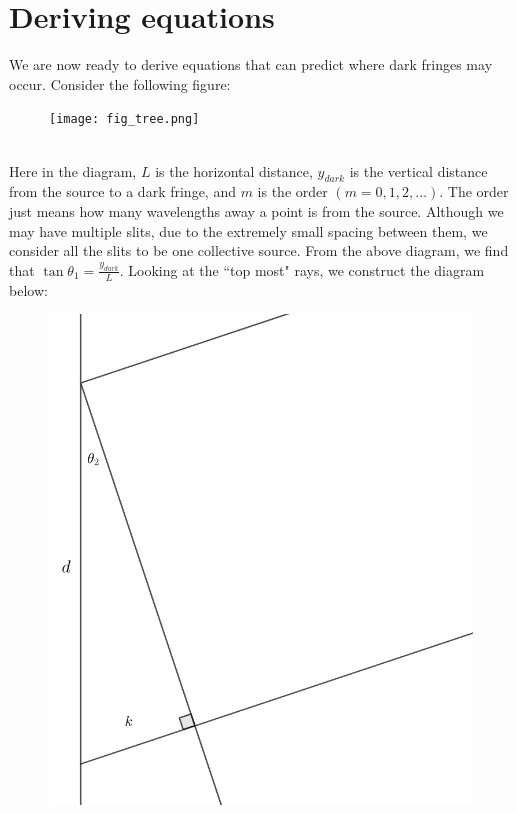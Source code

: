 \documentclass[12pt]{article}
\begin{document}
\section{Deriving equations}
We are now ready to derive equations that can predict where dark fringes may occur. Consider the following figure:
\begin{figure}[h!]
  \texttt{[image: fig\_tree.png]}
\end{figure}
\\Here in the diagram, $L$ is the horizontal distance, $y_{dark}$ is the vertical distance from the source to a dark fringe, and $m$ is the order $(m = 0,1,2, \dots)$. The order just means how many wavelengths away a point is from
the source. Although we may have multiple slits, due to the extremely small spacing between them, we consider all the slits to be one collective source. From the above diagram, we find that $\tan \theta_{1} = \frac{y_{dark}}{L}$.
\newpage
Looking at the ``top most" rays, we construct the diagram below:
\begin{figure}[h!]
  \centering
  \includegraphics[scale=0.54]{simtriangle.png}

\end{figure}
\end{document}
